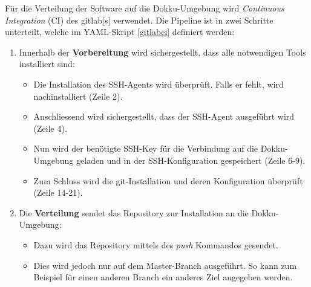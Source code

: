 Für die Verteilung der Software auf die \gls{Dokku}-Umgebung wird \textit{Continuous Integration} (CI) des \gls{gitlab}[s] verwendet. Die Pipeline ist in zwei Schritte unterteilt, welche im  \gls{YAML}-Skript \autoref{gitlabci} definiert werden:
\begin{enumerate}
    \item Innerhalb der \textbf{Vorbereitung} wird sichergestellt, dass alle not\-wend\-ig\-en Tools installiert sind:
        \begin{itemize}
            \item Die Installation des SSH-Agents wird überprüft. Falls er fehlt, wird nachinstalliert (Zeile 2). 
            \item Anschliessend wird sichergestellt, dass der SSH-Agent aus\-ge\-führt wird (Zeile 4).
            \item Nun wird der benötigte \gls{SSH}-Key für die Verbindung auf die \gls{Dokku}-Umgebung geladen und in der \gls{SSH}-Kon\-fi\-gu\-ra\-tion gespeichert (Zeile 6-9).
            \item Zum Schluss wird die \gls{git}-Installation und deren Konfiguration überprüft (Zeile 14-21).
        \end{itemize}
    \item Die \textbf{Verteilung} sendet das Repository zur Installation an die \gls{Dokku}-Umgebung:
    \begin{itemize}
        \item Dazu wird das Repository mittels des \textit{push} Kommandos gesendet.
        \item Dies wird jedoch nur auf dem Master-Branch ausgeführt. So kann zum Beispiel für einen anderen Branch ein anderes Ziel angegeben werden. 
    \end{itemize}
\end{enumerate}


